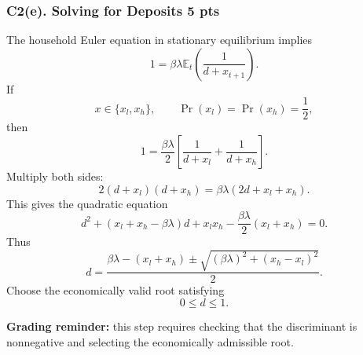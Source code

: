 \documentclass[11pt]{article}
\begin{document}
\clearpage
\subsubsection*{C2(e). Solving for Deposits \hfill 5 pts}

The household Euler equation in stationary equilibrium implies
\[
1
=
\beta\lambda \mathbb{E}_t\left(\frac{1}{d+x_{t+1}}\right).
\]
If
\[
x\in\{x_l,x_h\},
\qquad
\Pr(x_l)=\Pr(x_h)=\frac12,
\]
then
\[
1
=
\frac{\beta\lambda}{2}
\left[
\frac{1}{d+x_l}
+
\frac{1}{d+x_h}
\right].
\]
Multiply both sides:
\[
2(d+x_l)(d+x_h)
=
\beta\lambda(2d+x_l+x_h).
\]
This gives the quadratic equation
\[
d^2
+
(x_l+x_h-\beta\lambda)d
+
x_lx_h
-\frac{\beta\lambda}{2}(x_l+x_h)
=
0.
\]
Thus
\[
d
=
\frac{
\beta\lambda-(x_l+x_h)
\pm
\sqrt{
(\beta\lambda)^2+(x_h-x_l)^2
}
}{2}.
\]
Choose the economically valid root satisfying
\[
0\leq d\leq 1.
\]

\textbf{Grading reminder:} this step requires checking that the discriminant is nonnegative and selecting the economically admissible root.
\end{document}
